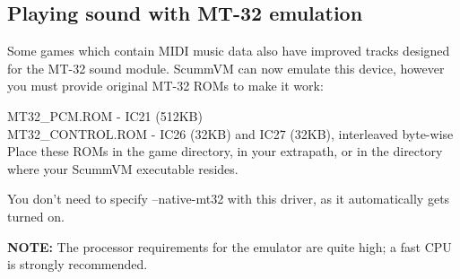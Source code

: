 \subsection{Playing sound with MT-32 emulation}

Some games which contain MIDI music data also have improved tracks designed
for the MT-32 sound module. ScummVM can now emulate this device, however you
must provide original MT-32 ROMs to make it work:

MT32\_PCM.ROM     - IC21 (512KB)\\
MT32\_CONTROL.ROM - IC26 (32KB) and IC27 (32KB), interleaved byte-wise\\

Place these ROMs in the game directory, in your extrapath, or in the directory
where your ScummVM executable resides.

You don't need to specify --native-mt32 with this driver, as it automatically
gets turned on.

\textbf{NOTE:} The processor requirements for the emulator are quite high; a fast CPU is
 strongly recommended.


